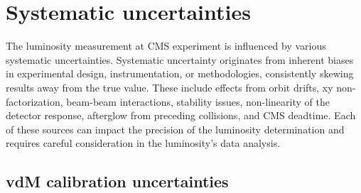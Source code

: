 \newpage
\section{Systematic uncertainties}

The luminosity measurement at CMS experiment is influenced by various systematic uncertainties. Systematic uncertainty originates from inherent biases in experimental design, instrumentation, or methodologies, consistently skewing results away from the true value. These include effects from orbit drifts, xy non-factorization, beam-beam interactions, stability issues, non-linearity of the detector response, afterglow from preceding collisions, and CMS deadtime. Each of these sources can impact the precision of the luminosity determination and requires careful consideration in the luminosity's data analysis.

\subsection{vdM calibration uncertainties}

